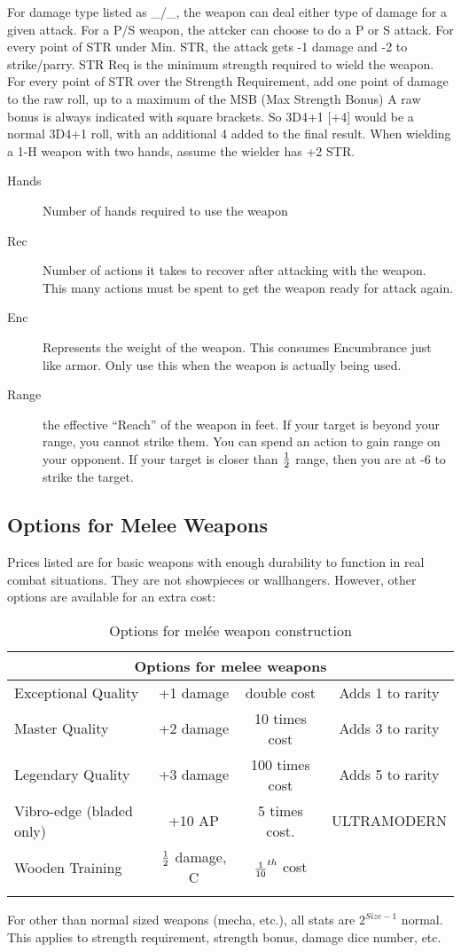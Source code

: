 For damage type listed as \_/\_, the weapon can deal either type of
damage for a given attack.  For a P/S weapon, the attcker can choose
to do a P or S attack. For every point of STR under Min. STR, the
attack gets -1 damage and -2 to strike/parry. STR Req is the minimum
strength required to wield the weapon. For every point of STR over the
Strength Requirement, add one point of damage to the raw roll, up to a
maximum of the MSB (Max Strength Bonus) A raw bonus is always
indicated with square brackets.  So 3D4+1 [+4] would be a normal 3D4+1
roll, with an additional 4 added to the final result. When wielding a
1-H weapon with two hands, assume the wielder has +2 STR.

\begin{description}
\item[Hands] Number of hands required to use the weapon
\item[Rec] Number of actions it takes to recover after attacking with
  the weapon.  This many actions must be spent to get the weapon ready
  for attack again.
\item[Enc] Represents the weight of the weapon.  This consumes
  Encumbrance just like armor.  Only use this when the weapon is
  actually being used.
\item[Range] the effective ``Reach'' of the weapon in feet.  If your
  target is beyond your range, you cannot strike them. You can spend
  an action to gain range on your opponent. If your target is closer
  than $1\over2$ range, then you are at -6 to strike the target.
\end{description}

\subsection{Options for Melee Weapons}
Prices listed are for basic weapons with enough durability to function
in real combat situations.  They are not showpieces or wallhangers.
However, other options are available for an extra cost:

\begin{longtable}{l|ccc}
\multicolumn{4}{c}{Options for melee weapons} \\
\hline
\endfirsthead
Exceptional Quality & +1 damage & double cost & Adds 1 to rarity \\
Master Quality & +2 damage & 10 times cost & Adds 3 to rarity \\	
Legendary Quality & +3 damage & 100 times cost & Adds 5 to rarity \\		
Vibro-edge (bladed only) & +10 AP & 5 times cost. & 	ULTRAMODERN \\
Wooden Training & $1\over2$ damage, C	& ${1\over{10}}^{th}$ cost \\
\caption{Options for mel\'{e}e weapon construction} \\
\end{longtable}


For other than normal sized weapons (mecha, etc.), all stats are
$2^{Size-1}$ normal.  This applies to strength requirement, strength
bonus, damage dice number, etc.
